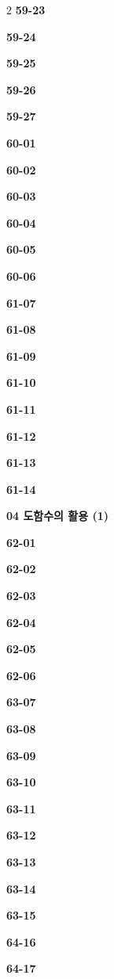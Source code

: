 \documentclass[10pt,a4paper]{article}
\begin{document}
\begin{multicols}{2}
\noindent\textbf{59-23}\ \par
\noindent\textbf{59-24}\ \par
\noindent\textbf{59-25}\ \par
\noindent\textbf{59-26}\ \par
\noindent\textbf{59-27}\ \par
\noindent\textbf{60-01}\ \par
\noindent\textbf{60-02}\ \par
\noindent\textbf{60-03}\ \par
\noindent\textbf{60-04}\ \par
\noindent\textbf{60-05}\ \par
\noindent\textbf{60-06}\ \par
\noindent\textbf{61-07}\ \par
\noindent\textbf{61-08}\ \par
\noindent\textbf{61-09}\ \par
\noindent\textbf{61-10}\ \par
\noindent\textbf{61-11}\ \par
\noindent\textbf{61-12}\ \par
\noindent\textbf{61-13}\ \par
\noindent\textbf{61-14}\ \par
\noindent\textbf{04 도함수의 활용 (1)}\par\smallskip
\noindent\textbf{62-01}\ \par
\noindent\textbf{62-02}\ \par
\noindent\textbf{62-03}\ \par
\noindent\textbf{62-04}\ \par
\noindent\textbf{62-05}\ \par
\noindent\textbf{62-06}\ \par
\noindent\textbf{63-07}\ \par
\noindent\textbf{63-08}\ \par
\noindent\textbf{63-09}\ \par
\noindent\textbf{63-10}\ \par
\noindent\textbf{63-11}\ \par
\noindent\textbf{63-12}\ \par
\noindent\textbf{63-13}\ \par
\noindent\textbf{63-14}\ \par
\noindent\textbf{63-15}\ \par
\noindent\textbf{64-16}\ \par
\noindent\textbf{64-17}\ \par

\end{multicols}
\end{document}
